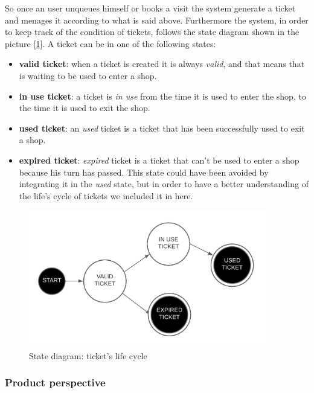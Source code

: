 So once an user unqueues himself or books a visit the system generate a ticket and menages it according to what is said above. Furthermore the system, in order to keep track of the condition of tickets, follows the state diagram shown in the picture [\ref{fig:ticketlifecycle}]. A ticket can be in one of the following states:
\begin{itemize}[topsep=0pt]
    \item \textbf{valid ticket}: when a ticket is created it is always \textit{valid}, and that means that is waiting to be used to enter a shop.
    \item \textbf{in use ticket}: a ticket is \textit{in use} from the time it is used to enter the shop, to the time it is used to exit the shop.
    \item \textbf{used ticket}: an \textit{used} ticket is a ticket that has been successfully used to exit a shop. 
    \item \textbf{expired ticket}: \textit{expired} ticket is a ticket that can't be used to enter a shop because his turn has passed. This state could have been avoided by integrating it in the \textit{used} state, but in order to have a better understanding of the life's cycle of tickets we included it in here. 
\end{itemize}

\begin{figure}[h!]
    \centering
    \includegraphics[height=6cm]{Images/statediagrams/ticketlifecycle.png}
    \caption{\label{fig:ticketlifecycle}State diagram: ticket's life cycle}
\end{figure}

\FloatBarrier

\subsubsection{Product perspective}
\label{subsubsect:productperspective}

